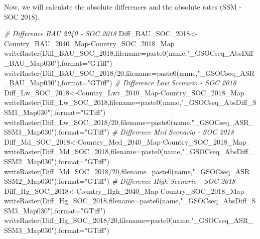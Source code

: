\documentclass[
  10pt,
  b5paper,
]{book}
\newenvironment{Shaded}{\begin{snugshade}}{\end{snugshade}}
\newcommand{\AttributeTok}[1]{\textcolor[rgb]{0.77,0.63,0.00}{#1}}
\newcommand{\CommentTok}[1]{\textcolor[rgb]{0.56,0.35,0.01}{\textit{#1}}}
\newcommand{\DecValTok}[1]{\textcolor[rgb]{0.00,0.00,0.81}{#1}}
\newcommand{\FunctionTok}[1]{\textcolor[rgb]{0.00,0.00,0.00}{#1}}
\newcommand{\NormalTok}[1]{#1}
\newcommand{\OtherTok}[1]{\textcolor[rgb]{0.56,0.35,0.01}{#1}}
\newcommand{\SpecialCharTok}[1]{\textcolor[rgb]{0.00,0.00,0.00}{#1}}
\newcommand{\StringTok}[1]{\textcolor[rgb]{0.31,0.60,0.02}{#1}}
\begin{document}
Now, we will calculate the absolute differences and the absolute rates (SSM - SOC 2018).

\begin{Shaded}
\begin{Highlighting}[]
\CommentTok{\# Difference BAU 2040 {-} SOC 2018}
\NormalTok{Diff\_BAU\_SOC\_2018}\OtherTok{\textless{}{-}}\NormalTok{Country\_BAU\_2040\_Map}\SpecialCharTok{{-}}\NormalTok{Country\_SOC\_2018\_Map}
\FunctionTok{writeRaster}\NormalTok{(Diff\_BAU\_SOC\_2018,}\AttributeTok{filename=}\FunctionTok{paste0}\NormalTok{(name,}\StringTok{"\_GSOCseq\_AbsDiff\_BAU\_Map030"}\NormalTok{),}\AttributeTok{format=}\StringTok{"GTiff"}\NormalTok{)}
\FunctionTok{writeRaster}\NormalTok{(Diff\_BAU\_SOC\_2018}\SpecialCharTok{/}\DecValTok{20}\NormalTok{,}\AttributeTok{filename=}\FunctionTok{paste0}\NormalTok{(name,}\StringTok{"\_GSOCseq\_ASR\_BAU\_Map030"}\NormalTok{),}\AttributeTok{format=}\StringTok{"GTiff"}\NormalTok{)}
\CommentTok{\# Difference Low Scenario {-} SOC 2018}
\NormalTok{Diff\_Lw\_SOC\_2018}\OtherTok{\textless{}{-}}\NormalTok{Country\_Lwr\_2040\_Map}\SpecialCharTok{{-}}\NormalTok{Country\_SOC\_2018\_Map}
\FunctionTok{writeRaster}\NormalTok{(Diff\_Lw\_SOC\_2018,}\AttributeTok{filename=}\FunctionTok{paste0}\NormalTok{(name,}\StringTok{"\_GSOCseq\_AbsDiff\_SSM1\_Map030"}\NormalTok{),}\AttributeTok{format=}\StringTok{"GTiff"}\NormalTok{)}
\FunctionTok{writeRaster}\NormalTok{(Diff\_Lw\_SOC\_2018}\SpecialCharTok{/}\DecValTok{20}\NormalTok{,}\AttributeTok{filename=}\FunctionTok{paste0}\NormalTok{(name,}\StringTok{"\_GSOCseq\_ASR\_SSM1\_Map030"}\NormalTok{),}\AttributeTok{format=}\StringTok{"GTiff"}\NormalTok{)}
\CommentTok{\# Difference Med Scenario {-} SOC 2018}
\NormalTok{Diff\_Md\_SOC\_2018}\OtherTok{\textless{}{-}}\NormalTok{Country\_Med\_2040\_Map}\SpecialCharTok{{-}}\NormalTok{Country\_SOC\_2018\_Map}
\FunctionTok{writeRaster}\NormalTok{(Diff\_Md\_SOC\_2018,}\AttributeTok{filename=}\FunctionTok{paste0}\NormalTok{(name,}\StringTok{"\_GSOCseq\_AbsDiff\_SSM2\_Map030"}\NormalTok{),}\AttributeTok{format=}\StringTok{"GTiff"}\NormalTok{)}
\FunctionTok{writeRaster}\NormalTok{(Diff\_Md\_SOC\_2018}\SpecialCharTok{/}\DecValTok{20}\NormalTok{,}\AttributeTok{filename=}\FunctionTok{paste0}\NormalTok{(name,}\StringTok{"\_GSOCseq\_ASR\_SSM2\_Map030"}\NormalTok{),}\AttributeTok{format=}\StringTok{"GTiff"}\NormalTok{)}
\CommentTok{\# Difference High Scenario {-} SOC 2018}
\NormalTok{Diff\_Hg\_SOC\_2018}\OtherTok{\textless{}{-}}\NormalTok{Country\_Hgh\_2040\_Map}\SpecialCharTok{{-}}\NormalTok{Country\_SOC\_2018\_Map}
\FunctionTok{writeRaster}\NormalTok{(Diff\_Hg\_SOC\_2018,}\AttributeTok{filename=}\FunctionTok{paste0}\NormalTok{(name,}\StringTok{"\_GSOCseq\_AbsDiff\_SSM3\_Map030"}\NormalTok{),}\AttributeTok{format=}\StringTok{"GTiff"}\NormalTok{)}
\FunctionTok{writeRaster}\NormalTok{(Diff\_Hg\_SOC\_2018}\SpecialCharTok{/}\DecValTok{20}\NormalTok{,}\AttributeTok{filename=}\FunctionTok{paste0}\NormalTok{(name,}\StringTok{"\_GSOCseq\_ASR\_SSM3\_Map030"}\NormalTok{),}\AttributeTok{format=}\StringTok{"GTiff"}\NormalTok{)}
\end{Highlighting}
\end{Shaded}
\end{document}
